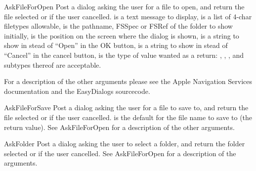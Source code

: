\begin{funcdesc}{AskFileForOpen}{
	}
Post a dialog asking the user for a file to open, and return the file
selected or  if the user cancelled.
 is a text message to display,
 is a list of 4-char filetypes allowable,
 is the pathname, FSSpec or FSRef of the folder
to show initially,
 is the  position on the screen where the
dialog is shown,
 is a string to show in stead of ``Open'' in the
OK button,
 is a string to show in stead of ``Cancel'' in the
cancel button,
 is the type of value wanted as a return: ,
, ,  and subtypes thereof are
acceptable.

For a description of the other arguments please see the Apple Navigation
Services documentation and the EasyDialogs sourcecode.
\end{funcdesc}

\begin{funcdesc}{AskFileForSave}{
	}
Post a dialog asking the user for a file to save to, and return the file
selected or  if the user cancelled.  is the
default for the file name to save to (the return value). See AskFileForOpen
for a description of the other arguments.
\end{funcdesc}

\begin{funcdesc}{AskFolder}{
	}
Post a dialog asking the user to select a folder, and return the folder
selected or  if the user cancelled. See AskFileForOpen
for a description of the arguments.
\end{funcdesc}

